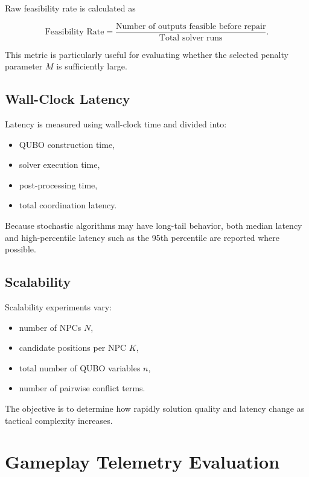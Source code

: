 \documentclass[12pt, a4paper]{article}
\begin{document}
Raw feasibility rate is calculated as

$$
\text{Feasibility Rate}
=
\frac{\text{Number of outputs feasible before repair}}
{\text{Total solver runs}}.
$$

This metric is particularly useful for evaluating whether the selected penalty parameter $M$ is sufficiently large.

\subsection*{Wall-Clock Latency}

Latency is measured using wall-clock time and divided into:

\begin{itemize}
\item QUBO construction time,
\item solver execution time,
\item post-processing time,
\item total coordination latency.
\end{itemize}

Because stochastic algorithms may have long-tail behavior, both median latency and high-percentile latency such as the 95th percentile are reported where possible.

\subsection*{Scalability}

Scalability experiments vary:

\begin{itemize}
\item number of NPCs $N$,
\item candidate positions per NPC $K$,
\item total number of QUBO variables $n$,
\item number of pairwise conflict terms.
\end{itemize}

The objective is to determine how rapidly solution quality and latency change as tactical complexity increases.

\section*{Gameplay Telemetry Evaluation}
\end{document}
